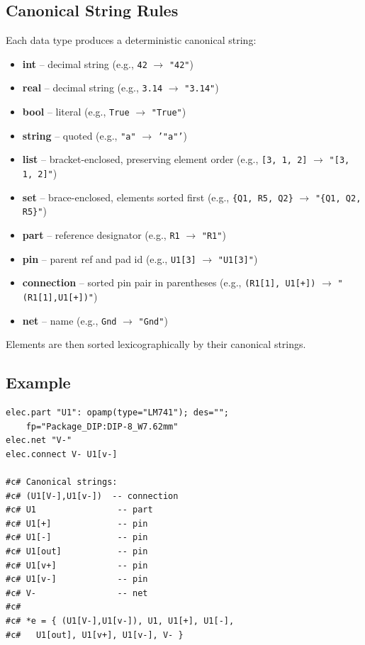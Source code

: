 \subsection{Canonical String Rules}
Each data type produces a deterministic canonical string:
\begin{itemize}
\item \textbf{int} -- decimal string (e.g., \texttt{42} $\rightarrow$ \texttt{"42"})
\item \textbf{real} -- decimal string (e.g., \texttt{3.14} $\rightarrow$ \texttt{"3.14"})
\item \textbf{bool} -- literal (e.g., \texttt{True} $\rightarrow$ \texttt{"True"})
\item \textbf{string} -- quoted (e.g., \texttt{"a"} $\rightarrow$ \texttt{'"a"'})
\item \textbf{list} -- bracket-enclosed, preserving element order (e.g., \texttt{[3, 1, 2]} $\rightarrow$ \texttt{"[3, 1, 2]"})
\item \textbf{set} -- brace-enclosed, elements sorted first (e.g., \texttt{\{Q1, R5, Q2\}} $\rightarrow$ \texttt{"\{Q1, Q2, R5\}"})
\item \textbf{part} -- reference designator (e.g., \texttt{R1} $\rightarrow$ \texttt{"R1"})
\item \textbf{pin} -- parent ref and pad id (e.g., \texttt{U1[3]} $\rightarrow$ \texttt{"U1[3]"})
\item \textbf{connection} -- sorted pin pair in parentheses (e.g., \texttt{(R1[1], U1[+])} $\rightarrow$ \texttt{"(R1[1],U1[+])"})
\item \textbf{net} -- name (e.g., \texttt{Gnd} $\rightarrow$ \texttt{"Gnd"})
\end{itemize}

Elements are then sorted lexicographically by their canonical strings.

\subsection{Example}
\begin{verbatim}
elec.part "U1": opamp(type="LM741"); des=""; 
    fp="Package_DIP:DIP-8_W7.62mm"
elec.net "V-"
elec.connect V- U1[v-]

#c# Canonical strings:
#c# (U1[V-],U1[v-])  -- connection
#c# U1                -- part
#c# U1[+]             -- pin
#c# U1[-]             -- pin
#c# U1[out]           -- pin
#c# U1[v+]            -- pin
#c# U1[v-]            -- pin
#c# V-                -- net
#c#
#c# *e = { (U1[V-],U1[v-]), U1, U1[+], U1[-], 
#c#   U1[out], U1[v+], U1[v-], V- }
\end{verbatim}


